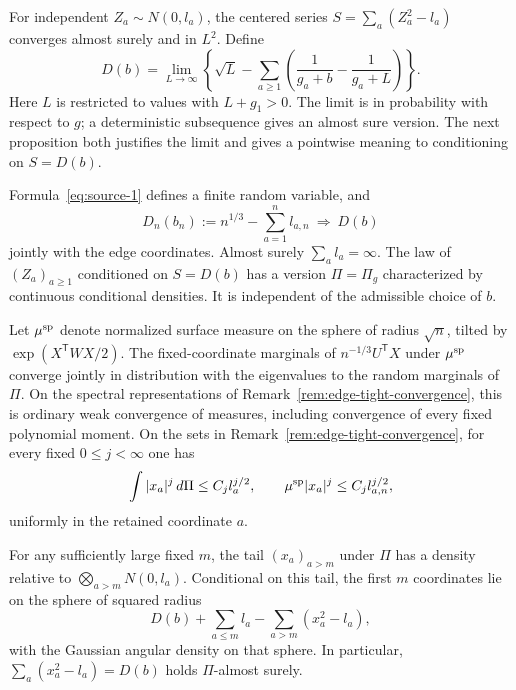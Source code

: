 For independent $Z_a\sim N(0,l_a)$, the centered series
$S=\sum_a(Z_a^2-l_a)$ converges almost surely and in $L^2$.  Define
\begin{equation}\label{eq:source-1}
 D(b)=\lim_{L\to\infty}\left\{
 \sqrt L-\sum_{a\ge1}\left(\frac1{g_a+b}-\frac1{g_a+L}\right)\right\}.
\end{equation}
Here $L$ is restricted to values with $L+g_1>0$.  The limit is in probability
with respect to $g$; a deterministic subsequence gives an almost sure
version.  The next proposition both justifies the limit and gives a
pointwise meaning to conditioning on $S=D(b)$.

\begin{proposition}
\label{prop:edge-conditioned-law}
Formula~\eqref{eq:source-1} defines a finite random variable, and
\[
 D_n(b_n):=n^{1/3}-\sum_{a=1}^n l_{a,n}
       \ \Longrightarrow\ D(b)
\]
jointly with the edge coordinates.  Almost surely $\sum_a l_a=\infty$.
The law of $(Z_a)_{a\ge1}$ conditioned on $S=D(b)$ has a version
$\Pi=\Pi_g$ characterized by continuous conditional densities.  It is
independent of the admissible choice of $b$.

Let $\mu^{\rm sp}$ denote normalized surface measure on the sphere of
radius $\sqrt n$, tilted by $\exp(X^{\mathsf T}WX/2)$.  The fixed-coordinate marginals of $n^{-1/3}U^{\mathsf T}X$ under
$\mu^{\rm sp}$ converge jointly in distribution with the eigenvalues to
the random marginals of $\Pi$.  On the spectral representations of
Remark~\ref{rem:edge-tight-convergence}, this is ordinary weak convergence
of measures, including convergence of every fixed polynomial moment.  On the sets in Remark~\ref{rem:edge-tight-convergence},
for every fixed $0\le j<\infty$ one has
\begin{equation}\label{eq:edge-coordinate-moments}
 \int |x_a|^j\,d\Pi\le C_j l_a^{j/2},
 \qquad
 \mu^{\rm sp}|x_a|^j\le C_j l_{a,n}^{j/2},
\end{equation}
uniformly in the retained coordinate $a$.

For any sufficiently large fixed $m$, the tail $(x_a)_{a>m}$ under
$\Pi$ has a density relative to $\bigotimes_{a>m}N(0,l_a)$.  Conditional
on this tail, the first $m$ coordinates lie on the sphere of squared radius
\begin{equation}\label{eq:edge-polar-radius}
 D(b)+\sum_{a\le m}l_a-\sum_{a>m}(x_a^2-l_a),
\end{equation}
with the Gaussian angular density on that sphere.  In particular,
$\sum_a(x_a^2-l_a)=D(b)$ holds $\Pi$-almost surely.
\end{proposition}

